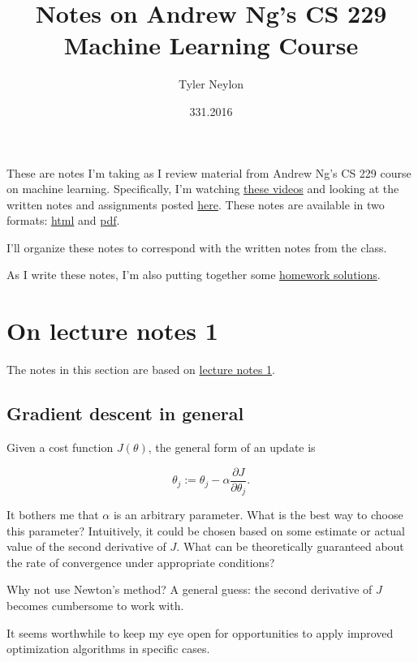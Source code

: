 \documentclass[]{article}
\title{Notes on Andrew Ng's CS 229 Machine Learning Course}
\author{Tyler Neylon}
\date{331.2016}
\begin{document}
\maketitle

\newcommand{\R}{\mathbb{R}}
\newcommand{\eqnset}[1]{\left.\mbox{$#1$}\quad\quad\right\rbrace}
\newcommand{\tr}{\text{tr}\;}

These are notes I'm taking as I review material from Andrew Ng's CS 229
course on machine learning. Specifically, I'm watching
\href{https://www.youtube.com/view_play_list?p=A89DCFA6ADACE599}{these
videos} and looking at the written notes and assignments posted
\href{http://cs229.stanford.edu/materials.html}{here}. These notes are
available in two formats:
\href{http://tylerneylon.com/notes/cs229/cs229.html}{html} and
\href{http://tylerneylon.com/notes/cs229/cs229.pdf}{pdf}.

I'll organize these notes to correspond with the written notes from the
class.

As I write these notes, I'm also putting together some
\href{http://tylerneylon.com/notes/cs229/cs229hw.html}{homework
solutions}.

\section{On lecture notes 1}\label{on-lecture-notes-1}

The notes in this section are based on
\href{http://cs229.stanford.edu/notes/cs229-notes1.pdf}{lecture notes
1}.

\subsection{Gradient descent in
general}\label{gradient-descent-in-general}

Given a cost function \(J(\theta)\), the general form of an update is

\[\theta_j := \theta_j - \alpha\frac{\partial J}{\partial \theta_j}.\]

It bothers me that \(\alpha\) is an arbitrary parameter. What is the
best way to choose this parameter? Intuitively, it could be chosen based
on some estimate or actual value of the second derivative of \(J\). What
can be theoretically guaranteed about the rate of convergence under
appropriate conditions?

Why not use Newton's method? A general guess: the second derivative of
\(J\) becomes cumbersome to work with.

It seems worthwhile to keep my eye open for opportunities to apply
improved optimization algorithms in specific cases.
\end{document}
